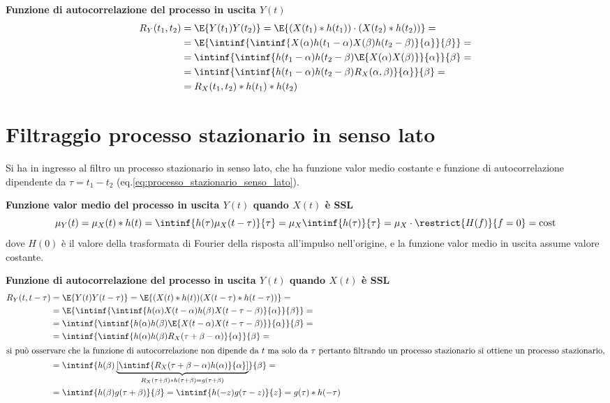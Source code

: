 \textbf{Funzione di autocorrelazione del processo in uscita $Y(t)$}
\begin{equation}
\begin{split}
	R_Y(t_1,t_2)&=\E{Y(t_1)Y(t_2)}=\E{(X(t_1)\ast h(t_1))\cdot(X(t_2)\ast h(t_2))}=\\
	&=\E{\intinf{\intinf{X(\alpha)h(t_1-\alpha)X(\beta)h(t_2-\beta)}{\alpha}}{\beta}}=\\
	&=\intinf{\intinf{h(t_1-\alpha)h(t_2-\beta)\E{X(\alpha)X(\beta)}}{\alpha}}{\beta}=\\
	&=\intinf{\intinf{h(t_1-\alpha)h(t_2-\beta)R_X(\alpha,\beta)}{\alpha}}{\beta}=\\
	&=R_X(t_1,t_2)\ast h(t_1)\ast h(t_2)
\end{split}
\end{equation}

\section{Filtraggio processo stazionario in senso lato}
\label{sec:filtraggio_processo_SSL}
Si ha in ingresso al filtro un processo stazionario in senso lato, che ha funzione valor medio costante e funzione di autocorrelazione dipendente da $\tau=t_1-t_2$ (eq.\ref{eq:processo_stazionario_senso_lato}).

\textbf{Funzione valor medio del processo in uscita $Y(t)$ quando $X(t)$ è SSL}
\begin{equation}
	\mu_Y(t)=\mu_X(t)\ast h(t)=\intinf{h(\tau)\mu_X(t-\tau)}{\tau}=\mu_X\intinf{h(\tau)}{\tau}=\mu_X\cdot \restrict{H(f)}{f=0}=\text{cost}
\end{equation}
dove $H(0)$ è il valore della trasformata di Fourier della risposta all'impulso nell'origine, e la funzione valor medio in uscita assume valore costante.

\textbf{Funzione di autocorrelazione del processo in uscita $Y(t)$ quando $X(t)$ è SSL}
\begin{align*}
	R_Y(t,t-\tau)&=\E{Y(t)Y(t-\tau)}=\E{(X(t)\ast h(t))(X(t-\tau)\ast h(t-\tau))}=\\&=\E{\intinf{\intinf{h(\alpha)X(t-\alpha)h(\beta)X(t-\tau-\beta)}{\alpha}}{\beta}}=\\&=\intinf{\intinf{h(\alpha)h(\beta)\E{X(t-\alpha)X(t-\tau-\beta)}}{\alpha}}{\beta}=\\&=\intinf{\intinf{h(\alpha)h(\beta)R_X(\tau+\beta-\alpha)}{\alpha}}{\beta}=\\
	\intertext{si può osservare che la funzione di autocorrelazione non dipende da $t$ ma solo da $\tau$ pertanto filtrando un processo stazionario si ottiene un processo stazionario,}
	&=\intinf{h(\beta)\underbrace{\left[\intinf{R_X(\tau+\beta-\alpha)h(\alpha)}{\alpha}\right]}_{R_X(\tau+\beta)\ast h(\tau+\beta)=g(\tau+\beta)}}{\beta}=\\
	&=\intinf{h(\beta)g(\tau+\beta)}{\beta}=\intinf{h(-z)g(\tau-z)}{z}=g(\tau)\ast h(-\tau)
\end{align*}


